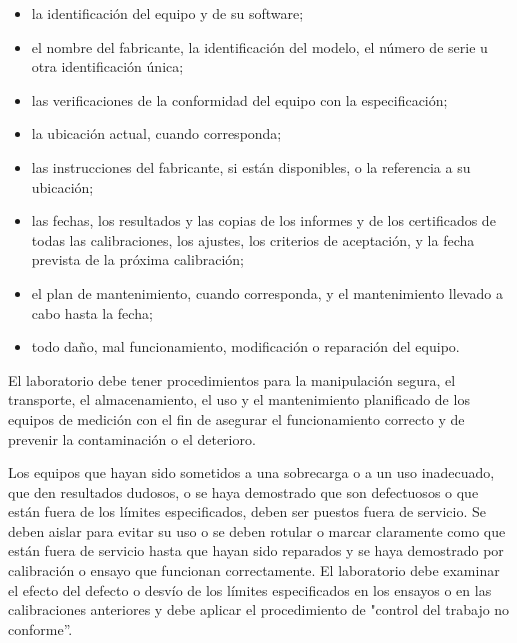 \begin{itemize}
	\item la identificación del equipo y de su software;
	
	\item el nombre del fabricante, la identificación del modelo, el número de serie u otra identificación única;
	
	\item las verificaciones de la conformidad del equipo con la especificación;
	
	\item la ubicación actual, cuando corresponda;
	
	\item las instrucciones del fabricante, si están disponibles, o la referencia a su ubicación;
	
	\item las fechas, los resultados y las copias de los informes y de los certificados de todas las calibraciones, los
	ajustes, los criterios de aceptación, y la fecha prevista de la próxima calibración;
	
	\item el plan de mantenimiento, cuando corresponda, y el mantenimiento llevado a cabo hasta la fecha;
	
	\item todo daño, mal funcionamiento, modificación o reparación del equipo.
\end{itemize}

\par \noindent
El laboratorio debe tener procedimientos para la manipulación segura, el transporte, el
almacenamiento, el uso y el mantenimiento planificado de los equipos de medición con el fin de asegurar el
funcionamiento correcto y de prevenir la contaminación o el deterioro.

\par \noindent
Los equipos que hayan sido sometidos a una sobrecarga o a un uso inadecuado, que den resultados
dudosos, o se haya demostrado que son defectuosos o que están fuera de los límites especificados, deben
ser puestos fuera de servicio. Se deben aislar para evitar su uso o se deben rotular o marcar claramente
como que están fuera de servicio hasta que hayan sido reparados y se haya demostrado por calibración o
ensayo que funcionan correctamente. El laboratorio debe examinar el efecto del defecto o desvío de los
límites especificados en los ensayos o en las calibraciones anteriores y debe aplicar el procedimiento de
"control del trabajo no conforme”.

